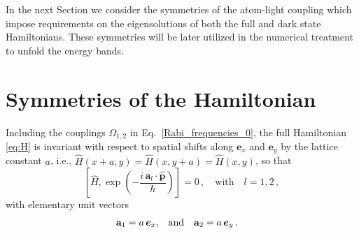 \documentclass[aps,pra,twocolumn,showpacs,superscriptaddress,floatfix,longbibliography]{revtex4-1}
\def\ex{\boldsymbol{e}_x}
\def\ey{\boldsymbol{e}_y}
\begin{document}
In the next Section we consider the symmetries of the atom-light coupling which impose requirements on the eigensolutions of both the full and dark state Hamiltonians.
These symmetries will be later utilized in the numerical treatment to unfold the energy bands.


\section{Symmetries of the Hamiltonian}
\label{sec:symmetries}

Including the couplings $\Omega_{1,2}$ in Eq.~\eqref{Rabi_frequencies_0}, the full Hamiltonian \eqref{eq:H} is invariant with respect
to spatial shifts along $\ex$ and $\ey$ by the lattice constant $a$, i.e.,  $\hat{H}(x+a,y) = \hat{H}(x,y+a) = \hat{H}(x,y)$, so that
%
\begin{equation}
\left[\hat{H},\exp\left(  - \frac{ i \, \mathbf{a}_l \cdot \hat{\mathbf{p}}}{\hbar}   \right)\right]=0\,,\quad\mathrm{with}\quad l=1,2\,, \label{eq_commutator_a}
\end{equation}
%
with elementary unit vectors
%
\begin{align}
\mathbf{a}_{1} &= a\, \ex, & {\rm and} && \mathbf{a}_{2} &=a\, \ey\,.
\end{align}
\end{document}
